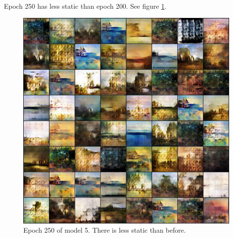 \documentclass[11pt,letterpaper]{article}
\begin{document}
				Epoch 250 has less static than epoch 200.
				See figure \ref{fig:wa128:epoch250generator}.
				\begin{figure}
					\centering
					\includegraphics[width=1.0\linewidth]{results/model5/epoch250_generator}
					\caption{Epoch 250 of model 5. There is less static than before.}
					\label{fig:wa128:epoch250generator}
				\end{figure}
\end{document}
